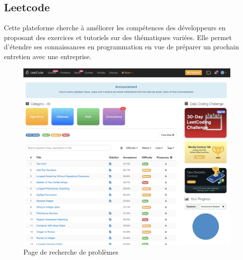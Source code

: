 \pagebreak
\subsection*{Leetcode}

Cette plateforme cherche à améliorer les compétences des développeurs en proposant des exercices et tutoriels sur des thématiques variées. Elle permet d'étendre ses connaissances en programmation en vue de préparer un prochain entretien avec une entreprise.

\begin{figure}[H]
    \includegraphics[width=\textwidth,height=0.35\textheight,keepaspectratio]{images/comparison/leetcode-1.png}
    \centering
    \caption[Leetcode : page de recherche de problèmes]{Page de recherche de problèmes}
\end{figure}

